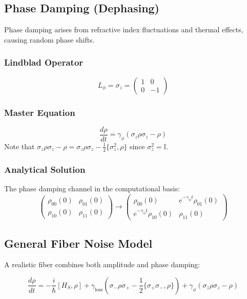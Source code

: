 \documentclass[12pt]{article}
\begin{document}
\subsection{Phase Damping (Dephasing)}
Phase damping arises from refractive index fluctuations and thermal effects, causing random phase shifts.

\subsubsection{Lindblad Operator}
\[
L_{\phi} = \sigma_z = \begin{pmatrix} 1 & 0 \\ 0 & -1 \end{pmatrix}
\]

\subsubsection{Master Equation}
\begin{equation}
\frac{d\rho}{dt} = \gamma_{\phi} \left( \sigma_z \rho \sigma_z - \rho \right)
\label{eq:phase_damp}
\end{equation}
Note that $\sigma_z \rho \sigma_z - \rho = \sigma_z \rho \sigma_z - \frac{1}{2}\{\sigma_z^2, \rho\}$ since $\sigma_z^2 = \mathbb{I}$.

\subsubsection{Analytical Solution}
The phase damping channel in the computational basis:
\[
\begin{pmatrix}
\rho_{00}(0) & \rho_{01}(0) \\
\rho_{10}(0) & \rho_{11}(0)
\end{pmatrix}
\longrightarrow
\begin{pmatrix}
\rho_{00}(0) & e^{-\gamma_{\phi} t} \rho_{01}(0) \\
e^{-\gamma_{\phi} t} \rho_{10}(0) & \rho_{11}(0)
\end{pmatrix}
\]

\subsection{General Fiber Noise Model}
A realistic fiber combines both amplitude and phase damping:

\begin{equation}
\boxed{\frac{d\rho}{dt} = -\frac{i}{\hbar}[H_S, \rho] + \gamma_{\text{loss}} \left( \sigma_- \rho \sigma_+ - \frac{1}{2}\{\sigma_+\sigma_-, \rho\} \right) + \gamma_{\phi} \left( \sigma_z \rho \sigma_z - \rho \right)}
\label{eq:full_model}
\end{equation}
\end{document}
